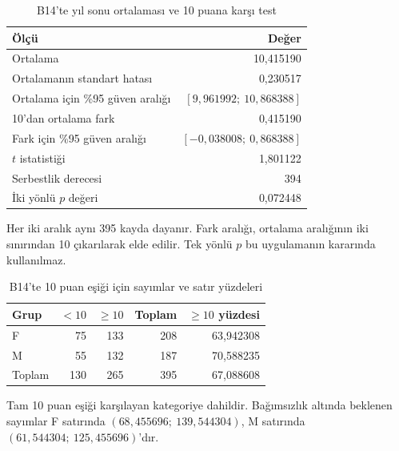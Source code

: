\begin{table}[H]
\centering
\caption{B14'te yıl sonu ortalaması ve 10 puana karşı test}
\label{tab:b14-dogrulanmis-ortalama}
\begin{tabular}{@{}lr@{}}
\toprule
Ölçü & Değer \\
\midrule
Ortalama & 10,415190 \\
Ortalamanın standart hatası & 0,230517 \\
Ortalama için \%95 güven aralığı & $[9{,}961992;\ 10{,}868388]$ \\
10'dan ortalama fark & 0,415190 \\
Fark için \%95 güven aralığı & $[-0{,}038008;\ 0{,}868388]$ \\
$t$ istatistiği & 1,801122 \\
Serbestlik derecesi & 394 \\
İki yönlü $p$ değeri & 0,072448 \\
\bottomrule
\end{tabular}
\par\smallskip
{\footnotesize Her iki aralık aynı 395 kayda dayanır. Fark aralığı,
ortalama aralığının iki sınırından 10 çıkarılarak elde edilir.
Tek yönlü $p$ bu uygulamanın kararında kullanılmaz.\par}
\end{table}

\begin{table}[H]
\centering
\caption{B14'te 10 puan eşiği için sayımlar ve satır yüzdeleri}
\label{tab:b14-dogrulanmis-sayim}
\begin{tabular}{@{}lrrrr@{}}
\toprule
Grup & $<10$ & $\geq10$ & Toplam & $\geq10$ yüzdesi \\
\midrule
F & 75 & 133 & 208 & 63,942308 \\
M & 55 & 132 & 187 & 70,588235 \\
\midrule
Toplam & 130 & 265 & 395 & 67,088608 \\
\bottomrule
\end{tabular}
\par\smallskip
{\footnotesize Tam 10 puan eşiği karşılayan kategoriye dahildir.
Bağımsızlık altında beklenen sayımlar F satırında
$(68{,}455696;\ 139{,}544304)$, M satırında
$(61{,}544304;\ 125{,}455696)$'dır.\par}
\end{table}

